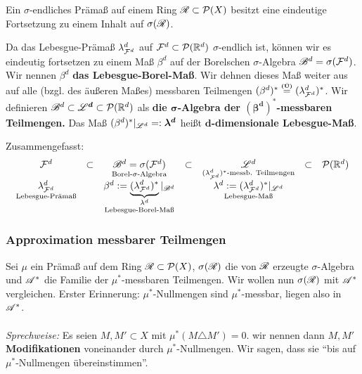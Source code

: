 \begin{korollar}
\begin{mdframed}
Ein $\sigma$-endliches Prämaß auf einem Ring $\RR \subset \PP(X)$ besitzt eine eindeutige Fortsetzung zu einem Inhalt auf $\sigma(\RR)$.
\end{mdframed}
\end{korollar}

\begin{definition}
\begin{mdframed}
Da das Lebesgue-Prämaß $\lambda^d_{\FF^d}$ auf $\FF^d\subset \PP(\R^d)$ $\sigma$-endlich ist, können wir es eindeutig fortsetzen zu einem Maß $\beta^d$ auf der Borelschen $\sigma$-Algebra $\BB^d = \sigma(\FF^d)$. Wir nennen $\beta^d$ \textbf{das Lebesgue-Borel-Maß}. Wir dehnen dieses Maß weiter aus auf alle (bzgl. des äußeren Maßes) messbaren Teilmengen $(\beta^d)^* \overset{\text{\Ueb}}= (\lambda^d_{\FF^d})^*$. Wir definieren $\BB^d \subset \boldsymbol{\LL^d} \subset \PP(\R^d)$ als \textbf{die $\boldsymbol\sigma$-Algebra der $\boldsymbol{(\beta^d)^*}$-messbaren Teilmengen. } Das Maß $(\beta^d)^*|_{\LL^d} =: \boldsymbol{\lambda^d}$ heißt \textbf{$\boldsymbol{d}$-dimensionale Lebesgue-Maß}.
\end{mdframed}
\end{definition}

Zusammengefasst:
\begin{equation*}
\begin{array}{ccccccc}
\FF^d	& \subset & 
	\underset{\text{Borel-}\sigma\text{-Algebra}}{\BB^d=\sigma(\FF^d)} & \subset  & \underset{(\lambda^d_{\FF^d})^*\text{-messb. Teilmengen}}{\LL^d}	& \subset & \PP(\R^d) \\ 
\underset{\text{Lebesgue-Prämaß}}{\lambda^d_{\FF^d}} & &
\underset{\text{Lebesgue-Borel-Maß}}{\beta^d := \underbrace{(\lambda^d_{\FF^d})^*}_{\lambda^d}|_{\BB^d}} &&
\underset{\text{Lebesgue-Maß}}{\lambda^d := (\lambda^d_{\FF^d})^*|_{\LL^d}}
\end{array}
\end{equation*}

\subsubsection{Approximation messbarer Teilmengen}
Sei $\mu$ ein Prämaß auf dem Ring $\RR \subset \PP(X)$, $\sigma(\RR)$ die von $\RR$ erzeugte $\sigma$-Algebra und $\AA^*$ die Familie der $\mu^*$-messbaren Teilmengen. Wir wollen nun $\sigma(\RR)$ mit $\AA^*$ vergleichen. Erster Erinnerung: $\mu^*$-Nullmengen sind $\mu^*$-messbar, liegen also in $\AA^*$.\\\\
\textit{Sprechweise:} Es seien $M,M'\subset X$ mit $\mu^*(M \triangle M') = 0$. wir nennen dann $M, M'$ \textbf{Modifikationen} voneinander durch $\mu^*$-Nullmengen. Wir sagen, dass sie ``bis auf $\mu^*$-Nullmengen übereinstimmen''.

